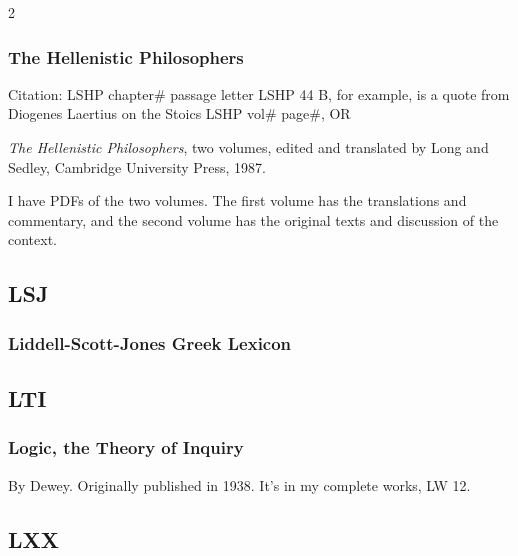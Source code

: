 \begin{multicols}{2}
		\subsubsection*{The Hellenistic Philosophers}
		
			Citation:
				LSHP chapter\# passage letter
					LSHP 44 B, for example, is a quote from Diogenes Laertius on the Stoics
				LSHP vol\# page\#, OR
			
			\textit{The Hellenistic Philosophers}, two volumes, edited and translated by Long and Sedley, Cambridge University Press, 1987.
			
			I have PDFs of the two volumes. The first volume has the translations and commentary, and the second volume has the original texts and discussion of the context.
			
	\subsection*{LSJ}
	
		\subsubsection*{Liddell-Scott-Jones Greek Lexicon}
		
			\phantom{.}
			
	\subsection*{LTI}
	
		\subsubsection*{Logic, the Theory of Inquiry}
		
			By Dewey. Originally published in 1938. It's in my complete works, LW 12.
			
	\subsection*{LXX}
	

\end{multicols}
